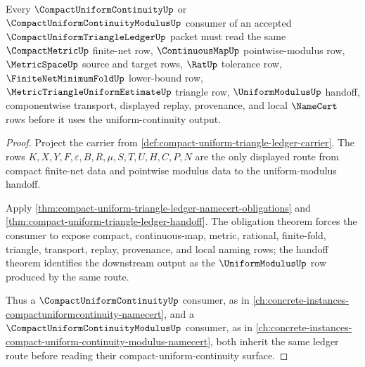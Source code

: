 \begin{theorem}
\label{thm:compact-uniform-triangle-ledger-compact-uniform-continuity-route}
Every $\CompactUniformContinuityUp$ or $\CompactUniformContinuityModulusUp$ consumer of an accepted $\CompactUniformTriangleLedgerUp$ packet must read the same $\CompactMetricUp$ finite-net row, $\ContinuousMapUp$ pointwise-modulus row, $\MetricSpaceUp$ source and target rows, $\RatUp$ tolerance row, $\FiniteNetMinimumFoldUp$ lower-bound row, $\MetricTriangleUniformEstimateUp$ triangle row, $\UniformModulusUp$ handoff, componentwise transport, displayed replay, provenance, and local $\NameCert$ rows before it uses the uniform-continuity output.
\end{theorem}
\begin{proof}
Project the carrier from \autoref{def:compact-uniform-triangle-ledger-carrier}. The rows $K,X,Y,F,\varepsilon,B,R,\mu,S,T,U,H,C,P,N$ are the only displayed route from compact finite-net data and pointwise modulus data to the uniform-modulus handoff.

Apply \autoref{thm:compact-uniform-triangle-ledger-namecert-obligations} and \autoref{thm:compact-uniform-triangle-ledger-handoff}. The obligation theorem forces the consumer to expose compact, continuous-map, metric, rational, finite-fold, triangle, transport, replay, provenance, and local naming rows; the handoff theorem identifies the downstream output as the $\UniformModulusUp$ row produced by the same route.

Thus a $\CompactUniformContinuityUp$ consumer, as in \autoref{ch:concrete-instances-compactuniformcontinuity-namecert}, and a $\CompactUniformContinuityModulusUp$ consumer, as in \autoref{ch:concrete-instances-compact-uniform-continuity-modulus-namecert}, both inherit the same ledger route before reading their compact-uniform-continuity surface.
\end{proof}
